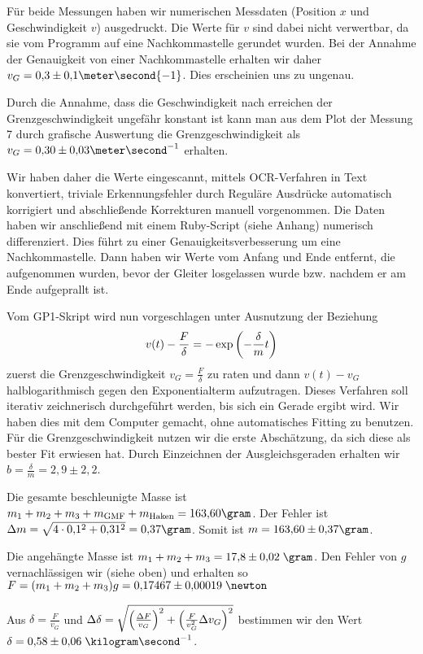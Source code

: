 \documentclass[a4paper,german,12pt,smallheadings]{scrartcl}
\begin{document}
Für beide Messungen haben wir numerischen Messdaten (Position $x$ und
Geschwindigkeit $v$) ausgedruckt. Die Werte für $v$ sind dabei nicht
verwertbar, da sie vom Programm auf eine Nachkommastelle gerundet wurden. Bei
der Annahme der Genauigkeit von einer Nachkommastelle erhalten wir daher $v_G =
0{,}3 \pm 0{,}1 \meter \second{-1}$. Dies erscheinien uns zu ungenau.

Durch die Annahme, dass die Geschwindigkeit nach erreichen der
Grenzgeschwindigkeit ungefähr konstant ist kann man aus dem Plot der Messung 7
durch grafische Auswertung die Grenzgeschwindigkeit als $v_G = 0{,}30 \pm
0{,}03 \meter \second^{-1}$ erhalten.

Wir haben daher die Werte eingescannt, mittels OCR-Verfahren in Text konvertiert,
triviale Erkennungsfehler durch Reguläre Ausdrücke automatisch korrigiert und
abschließende Korrekturen manuell vorgenommen. Die Daten haben wir anschließend
mit einem Ruby-Script (siehe Anhang) numerisch differenziert. Dies führt zu
einer Genauigkeitsverbesserung um eine Nachkommastelle. Dann haben wir Werte
vom Anfang und Ende entfernt, die aufgenommen wurden, bevor der Gleiter
losgelassen wurde bzw. nachdem er am Ende aufgeprallt ist.

Vom GP1-Skript wird nun vorgeschlagen unter Ausnutzung der Beziehung
\begin{equation} v(t) - \frac{F}{\delta} = -\exp \del{- \frac{\delta}{m} t}
\end{equation} zuerst die Grenzgeschwindigkeit $v_G = \frac{F}{\delta}$ zu
raten und dann $v(t) - v_G$ halblogarithmisch gegen den Exponentialterm
aufzutragen. Dieses Verfahren soll iterativ zeichnerisch durchgeführt werden,
bis sich ein Gerade ergibt wird. Wir haben dies mit dem Computer gemacht, ohne
automatisches Fitting zu benutzen. Für die Grenzgeschwindigkeit nutzen wir die
erste Abschätzung, da sich diese als bester Fit erwiesen hat. Durch Einzeichnen
der Ausgleichsgeraden erhalten wir $b = \frac{\delta}{m} = 2{,}9 \pm 2{,}2$.

Die gesamte beschleunigte Masse ist $m_1 + m_2 + m_3 + m_\text{GMF} +
m_\text{Haken} = 163{,}60 \gram$. Der Fehler ist $\Delta m = \sqrt{4 \cdot
0{,}1^2 + 0{,}31^2} = 0{,}37 \gram$. Somit ist $m = 163{,}60 \pm 0{,}37 \gram$.

Die angehängte Masse ist $m_1 + m_2 + m_3 = 17{,}8 \pm 0{,}02 \;\gram$. Den
Fehler von $g$ vernachlässigen wir (siehe oben) und erhalten so $F = (m_1 + m_2
+ m_3) g = 0{,}17467\pm 0{,}00019 \;\newton$

Aus $\delta = \frac{F}{v_G}$ und $\Delta \delta = \sqrt{\del{\frac{\Delta
F}{v_G}}^2 + \del{\frac{F}{v_G^2} \Delta v_G}^2}$ bestimmen wir den
Wert $\delta =  0{,}58\pm0{,}06 \; \kilogram\second^{-1}$.
\end{document}

